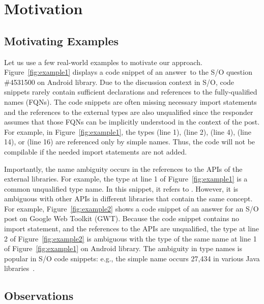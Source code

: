 \section{Motivation}
\label{motiv:sec}

\subsection{Motivating Examples}
\label{examples:sec}



Let us use a few real-world examples to motivate our approach.
Figure~\ref{fig:example1} displays a code snippet of an answer~to the
S/O question \#4531500 on Android library. Due to the discussion
context in S/O, code snippets rarely contain sufficient declarations
and references to the fully-qualified names (FQNs). The code snippets
are often missing necessary import statements and the references to
the external types are also unqualified since the responder assumes
that those FQNs can be implicitly understood in the context of the
post. For example, in Figure~\ref{fig:example1}, the types
 (line 1),  (line 2),  (line
4),  (line 14), or  (line 16) are referenced
only by simple names. Thus, the code will not be compilable if
the needed import statements are not added.



Importantly, the name ambiguity occurs in the references to the APIs
of the external libraries. For example, the type  at line
1 of Figure~\ref{fig:example1} is a common unqualified type name. In
this snippet, it refers to . However, it
is ambiguous with other APIs in different libraries that contain the
same concept. For example, Figure~\ref{fig:example2} shows a code
snippet of an answer for an S/O post on Google Web Toolkit
(GWT). Because the code snippet contains no import statement, and the
references to the APIs are unqualified, the type  at line
2 of Figure~\ref{fig:example2} is ambiguous with the type of the same
name at line 1 of Figure~\ref{fig:example1} on Android library. The
ambiguity in type names is popular in S/O code snippets: e.g., the
simple name  occurs 27,434 in various Java
libraries~\cite{liveapi14}.

\subsection{Observations}
\label{sec:obs}


